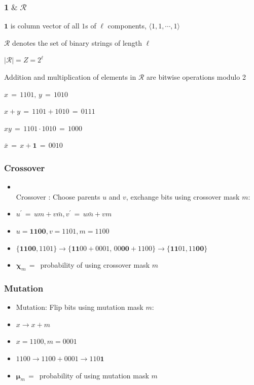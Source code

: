 \documentclass[aspectratio=169]{beamer}
\begin{document}
  \begin{frame}
    \frametitle{$\bm{1} \;\&\; \mathcal{R}$}
    \begin{itemize}
    \item{$\bm{1}$ is column vector of all $1$s of $\ell$ components, $\langle 1,1,\cdots,1 \rangle$}
   
    
    \item{$\mathcal{R}$ denotes the set of binary strings of length $\ell$
    \item $|\mathcal{R}| = Z = 2^\ell$ }
      
    \item{Addition and multiplication of elements in $\mathcal{R}$ are bitwise operations modulo 2}
    \item{$x \,=\, 1101,\, y \,=\, 1010 $}
    \item{$x + y \,=\, 1101 + 1010 \,=\, 0111$}
    \item{$xy \,=\, 1101 \cdot 1010 \,=\, 1000$}
    \item{$\bar{x} \,=\, x + \bm{1} \,=\, 0010$}
      
    \end{itemize}
  \end{frame}
  
  \begin{frame}
    \frametitle{Crossover}    
    \begin{itemize}    
      \item{ \mbox{}\\[-0.2in] Crossover : Choose parents $u$ and $v$, exchange bits using crossover mask $m$: }
      \item{$u^\prime \,=\, um + v\bar{m} , v^\prime \,=\, u\bar{m} + vm$}      
      \item{$u = \bm{1100}, v = 1101, m = 1100$}
      \item{$\{\bm{1100}, 1101\} \to \{\bm{11}00 + 0001,\, 00\bm{00} + 1100\} \to \{\bm{11}01, 11\bm{00}\}$}
      \item{$\bm{\chi}_m \,=\,$ probability of using crossover mask $m$ }
      \vspace{0.06in}%
    \end{itemize}
  \end{frame}
  
  \begin{frame}
    \frametitle{Mutation}
    \begin{itemize}
      \item{Mutation: Flip bits using mutation mask $m$:}
      \item{$x \to x + m$}
      \item{$x = 1100, m = 0001$}
      \item{$1100 \to 1100 + 0001 \to 110\bm{1}$}
      \item{$\bm{\mu}_m \,=\,$ probability of using mutation mask $m$ }
    \end{itemize}
  \end{frame}
  
\end{document}
